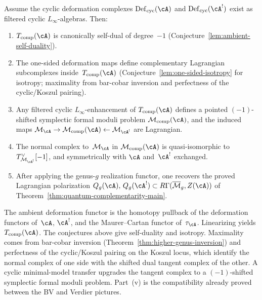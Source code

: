 \begin{conjecture}
\label{thm:ambient-complementarity}
Assume the cyclic deformation complexes
$\mathrm{Def}_{\mathrm{cyc}}(\cA)$ and
$\mathrm{Def}_{\mathrm{cyc}}(\cA^!)$ exist as filtered
cyclic $L_\infty$-algebras.  Then:
\begin{enumerate}[label=\textup{(\roman*)}]
\item $T_{\mathrm{comp}}(\cA)$ is canonically self-dual
  of degree~$-1$
  \textup{(}Conjecture~\textup{\ref{lem:ambient-self-duality})}.
\item The one-sided deformation maps define complementary
  Lagrangian subcomplexes inside~$T_{\mathrm{comp}}(\cA)$
  \textup{(}Conjecture~\textup{\ref{lem:one-sided-isotropy}}
  for isotropy; maximality from bar-cobar inversion and
  perfectness of the cyclic/Koszul pairing\textup{)}.
\item Any filtered cyclic $L_\infty$-enhancement of
  $T_{\mathrm{comp}}(\cA)$ defines a pointed $(-1)$-shifted
  symplectic formal moduli problem
  $\mathcal{M}_{\mathrm{comp}}(\cA)$, and the induced maps
  $\mathcal{M}_\cA \to \mathcal{M}_{\mathrm{comp}}(\cA)
  \leftarrow \mathcal{M}_{\cA^!}$ are Lagrangian.
\item The normal complex to~$\mathcal{M}_\cA$ in
  $\mathcal{M}_{\mathrm{comp}}(\cA)$ is quasi-isomorphic to
  $T_{\mathcal{M}_{\cA^!}}^\vee[-1]$, and symmetrically
  with $\cA$ and~$\cA^!$ exchanged.
\item After applying the genus-$g$ realization functor, one
  recovers the proved Lagrangian polarization
  $Q_g(\cA),\, Q_g(\cA^!)
  \subset R\Gamma(\overline{\mathcal{M}}_g, Z(\cA))$
  of Theorem~\textup{\ref{thm:quantum-complementarity-main}}.
\end{enumerate}
\end{conjecture}

\begin{evidence}[Evidence]
The ambient deformation functor is the homotopy pullback
of the deformation functors of~$\cA$, $\cA^!$, and the
Maurer--Cartan functor of~$\tau_\cA$.  Linearizing yields
$T_{\mathrm{comp}}(\cA)$.  The conjectures above give self-duality
and isotropy.  Maximality comes from bar-cobar inversion
(Theorem~\ref{thm:higher-genus-inversion}) and perfectness
of the cyclic/Koszul pairing on the Koszul locus, which
identify the normal complex of one side with the shifted
dual tangent complex of the other.  A cyclic minimal-model
transfer upgrades the tangent complex to a $(-1)$-shifted
symplectic formal moduli problem.  Part~(v) is the
compatibility already proved between the BV and Verdier
pictures.
\end{evidence}


